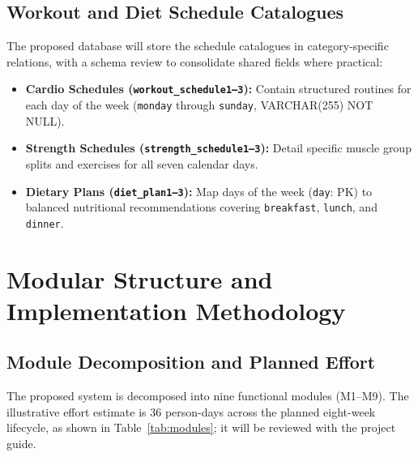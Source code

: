 \documentclass[11pt,a4paper]{report}
\begin{document}
\section{Workout and Diet Schedule Catalogues}
The proposed database will store the schedule catalogues in category-specific relations, with a schema review to consolidate shared fields where practical:
\begin{itemize}
  \item \textbf{Cardio Schedules (\texttt{workout\_schedule1--3}):} Contain structured routines for each day of the week (\texttt{monday} through \texttt{sunday}, VARCHAR(255) NOT NULL).
  \item \textbf{Strength Schedules (\texttt{strength\_schedule1--3}):} Detail specific muscle group splits and exercises for all seven calendar days.
  \item \textbf{Dietary Plans (\texttt{diet\_plan1--3}):} Map days of the week (\texttt{day}: PK) to balanced nutritional recommendations covering \texttt{breakfast}, \texttt{lunch}, and \texttt{dinner}.
\end{itemize}

\chapter{Modular Structure and Implementation Methodology}

\section{Module Decomposition and Planned Effort}
The proposed system is decomposed into nine functional modules (M1--M9). The illustrative effort estimate is 36 person-days across the planned eight-week lifecycle, as shown in Table~\ref{tab:modules}; it will be reviewed with the project guide.
\end{document}
